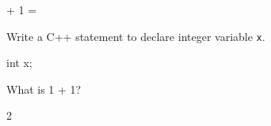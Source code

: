 

\renewcommand\AUTHOR{jdoe5@cougars.ccis.edu} %


\topmattertwo

 + 1 = 

\nextq
Write a C++ statement to declare integer variable \verb!x!.
\\
\ANSWER
\begin{answercode}
int x;
\end{answercode}

\nextq
What is 1 + 1?
\\
\ANSWER
\begin{answerlong}
2
\end{answerlong}

\newpage


